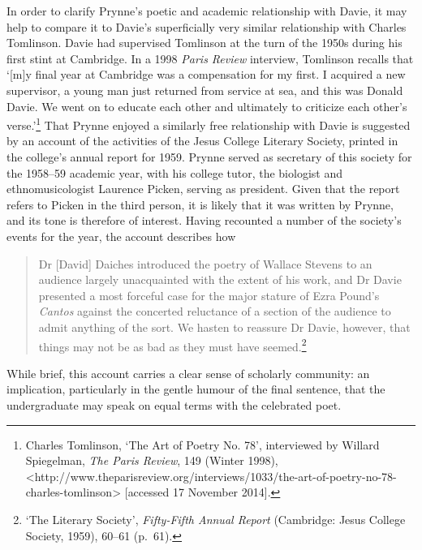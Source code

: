 \documentclass[]{article}
\begin{document}
In order to clarify Prynne’s poetic and academic relationship with
Davie, it may help to compare it to Davie’s superficially very similar
relationship with Charles Tomlinson. Davie had supervised Tomlinson at
the turn of the 1950s during his first stint at Cambridge. In a 1998
\emph{Paris Review} interview, Tomlinson recalls that ‘{[}m{]}y final
year at Cambridge was a compensation for my first. I acquired a new
supervisor, a young man just returned from service at sea, and this was
Donald Davie. We went on to educate each other and ultimately to
criticize each other’s verse.’\footnote{Charles Tomlinson, ‘The Art of
  Poetry No. 78’, interviewed by Willard Spiegelman, \emph{The Paris
  Review}, 149 (Winter 1998),
  \textless{}http://www.theparisreview.org/interviews/1033/the-art-of-poetry-no-78-charles-tomlinson\textgreater{}
  {[}accessed 17 November 2014{]}.} That Prynne enjoyed a similarly free
relationship with Davie is suggested by an account of the activities of
the Jesus College Literary Society, printed in the college’s annual
report for 1959. Prynne served as secretary of this society for the
1958–59 academic year, with his college tutor, the biologist and
ethnomusicologist Laurence Picken, serving as president. Given that the
report refers to Picken in the third person, it is likely that it was
written by Prynne, and its tone is therefore of interest. Having
recounted a number of the society’s events for the year, the account
describes how

\begin{quote}
\singlespacing Dr {[}David{]} Daiches introduced the poetry of Wallace
Stevens to an audience largely unacquainted with the extent of his work,
and Dr Davie presented a most forceful case for the major stature of
Ezra Pound’s \emph{Cantos} against the concerted reluctance of a section
of the audience to admit anything of the sort. We hasten to reassure Dr
Davie, however, that things may not be as bad as they must have
seemed.\footnote{‘The Literary Society’, \emph{Fifty-Fifth Annual
  Report} (Cambridge: Jesus College Society, 1959), 60–61 (p.~61).}
\end{quote}

\noindent While brief, this account carries a clear sense of scholarly
community: an implication, particularly in the gentle humour of the
final sentence, that the undergraduate may speak on equal terms with the
celebrated poet.
\end{document}
